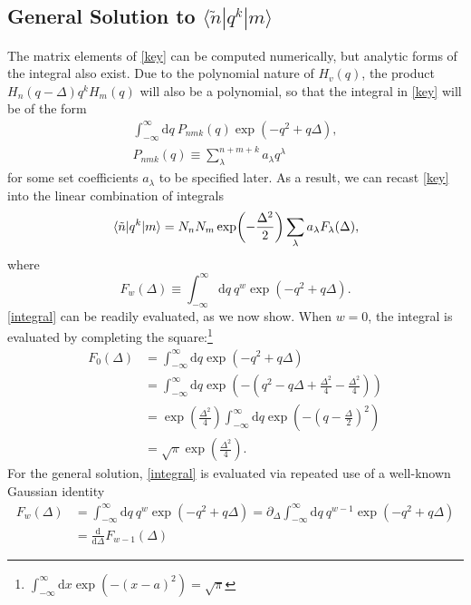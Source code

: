 \documentclass[aip, jcp, reprint, onecolumn, nofootinbib]{revtex4-2}
\begin{document}
\subsection{General Solution to $\langle \tilde{n} | q^k | m \rangle$}
The matrix elements of \autoref{key} can be computed numerically, but analytic forms of the integral also exist. 
Due to the polynomial nature of $H_v(q)$, the product $H_n(q-\Delta) q^k H_m(q)$ will also be a polynomial, so that the integral in \autoref{key} will be of the form
\begin{eqnarray}\label{eq:Pnmkdef}
	\int_{-\infty}^\infty \mathrm{d}q \ P_{nmk}(q) \exp(-q^2 + q\Delta), \\
	P_{nmk}(q) \equiv \sum_\lambda^{n+m+k} a_\lambda q^\lambda
\end{eqnarray}
for some set coefficients $a_\lambda$ to be specified later. 
As a result, we can recast \autoref{key} into the linear combination of integrals
\begin{equation}\label{eq:analytic_form}
	\mel{\tilde{n}}{q^k}{m} = N_n N_m \exp(-\frac{\Delta^2}{2}) \sum_\lambda a_\lambda F_\lambda(\Delta),
\end{equation}
where
\begin{equation}\label{integral}
	F_w(\Delta) \equiv \int_{-\infty}^\infty \mathrm{d}q \ q^w \exp(-q^2 + q\Delta).
\end{equation}
\autoref{integral} can be readily evaluated, as we now show. 
 When $w=0$, the integral is evaluated by completing the square:\footnote{$\int_{-\infty}^{\infty} \mathrm{d}x \exp(-(x-a)^2) = \sqrt{\pi}$}
\begin{equation}
	\begin{split}
		F_0(\Delta) & =  \int_{-\infty}^\infty \mathrm{d}q \exp\left(-q^2 + q\Delta\right)\\
		&= \int_{-\infty}^\infty \mathrm{d}q \exp(-(q^2 - q\Delta +\frac{\Delta^2}{4} - \frac{\Delta^2}{4}))\\
		&= \exp(\frac{\Delta^2}{4}) \int_{-\infty}^\infty \mathrm{d}q \exp(-(q - \frac{\Delta}{2})^2) \\
		&= \sqrt{\pi} \exp(\frac{\Delta^2}{4}).
	\end{split}
\end{equation}
For the general solution, \autoref{integral} is evaluated via repeated use of a well-known Gaussian identity
\begin{equation}\label{identity}
	\begin{split}
		F_w(\Delta) &= \int_{-\infty}^\infty \mathrm{d}q \ q^w \exp(-q^2 + q\Delta) = \partial_{\Delta} \int_{-\infty}^\infty \mathrm{d}q \ q^{w-1} \exp(-q^2 + q\Delta) \\
		&= \frac{\mathrm{d}}{\mathrm{d}\Delta} F_{w-1}(\Delta)
	\end{split}
\end{equation}
\end{document}
